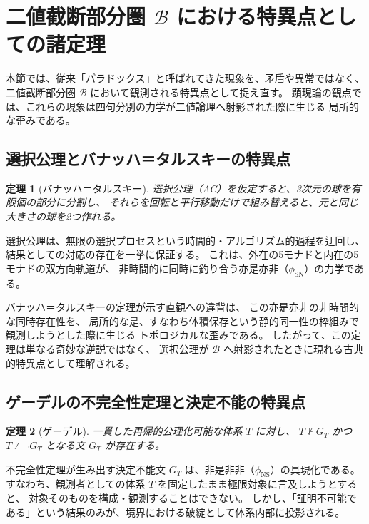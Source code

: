 \documentclass[11pt,a4paper]{ltjsarticle}
\newtheorem{theorem}{定理}
\newcommand{\phiSN}{\phi_{\text{SN}}}
\newcommand{\phiNS}{\phi_{\text{NS}}}
\newcommand{\Bval}{\mathcal{B}}
\begin{document}
\section{二値截断部分圏 \texorpdfstring{$\Bval$}{B} における特異点としての諸定理}

本節では、従来「パラドックス」と呼ばれてきた現象を、矛盾や異常ではなく、
二値截断部分圏 $\Bval$ において観測される特異点として捉え直す。
顕現論の観点では、これらの現象は四句分別の力学が二値論理へ射影された際に生じる
局所的な歪みである。

\subsection{選択公理とバナッハ＝タルスキーの特異点}

\begin{theorem}[バナッハ＝タルスキー]
  選択公理（AC）を仮定すると、3次元の球を有限個の部分に分割し、
  それらを回転と平行移動だけで組み替えると、元と同じ大きさの球を2つ作れる。
\end{theorem}

選択公理は、無限の選択プロセスという時間的・アルゴリズム的過程を迂回し、
結果としての対応の存在を一挙に保証する。
これは、外在の5モナドと内在の5モナドの双方向軌道が、
非時間的に同時に釣り合う亦是亦非（$\phiSN$）の力学である。

バナッハ＝タルスキーの定理が示す直観への違背は、
この亦是亦非の非時間的な同時存在性を、
局所的な是、すなわち体積保存という静的同一性の枠組みで観測しようとした際に生じる
トポロジカルな歪みである。
したがって、この定理は単なる奇妙な逆説ではなく、
選択公理が $\Bval$ へ射影されたときに現れる古典的特異点として理解される。

\subsection{ゲーデルの不完全性定理と決定不能の特異点}

\begin{theorem}[ゲーデル]
  一貫した再帰的公理化可能な体系 $T$ に対し、
  $T \nvdash G_T$ かつ $T \nvdash \neg G_T$ となる文 $G_T$ が存在する。
\end{theorem}

不完全性定理が生み出す決定不能文 $G_T$ は、非是非非（$\phiNS$）の具現化である。
すなわち、観測者としての体系 $T$ を固定したまま極限対象に言及しようとすると、
対象そのものを構成・観測することはできない。
しかし、「証明不可能である」という結果のみが、境界における破綻として体系内部に投影される。
\end{document}
